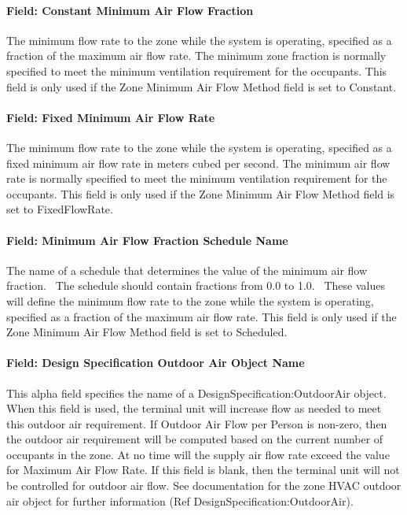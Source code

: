 \paragraph{Field: Constant Minimum Air Flow Fraction}\label{field-constant-minimum-air-flow-fraction-1}

The minimum flow rate to the zone while the system is operating, specified as a fraction of the maximum air flow rate. The minimum zone fraction is normally specified to meet the minimum ventilation requirement for the occupants. This field is only used if the Zone Minimum Air Flow Method field is set to Constant.

\paragraph{Field: Fixed Minimum Air Flow Rate}\label{field-fixed-minimum-air-flow-rate-1}

The minimum flow rate to the zone while the system is operating, specified as a fixed minimum air flow rate in meters cubed per second. The minimum air flow rate is normally specified to meet the minimum ventilation requirement for the occupants. This field is only used if the Zone Minimum Air Flow Method field is set to FixedFlowRate.

\paragraph{Field: Minimum Air Flow Fraction Schedule Name}\label{field-minimum-air-flow-fraction-schedule-name-1}

The name of a schedule that determines the value of the minimum air flow fraction.~ The schedule should contain fractions from 0.0 to 1.0.~ These values will define the minimum flow rate to the zone while the system is operating, specified as a fraction of the maximum air flow rate. This field is only used if the Zone Minimum Air Flow Method field is set to Scheduled.

\paragraph{Field: Design Specification Outdoor Air Object Name}\label{field-design-specification-outdoor-air-object-name-1}

This alpha field specifies the name of a DesignSpecification:OutdoorAir object. When this field is used, the terminal unit will increase flow as needed to meet this outdoor air requirement. If Outdoor Air Flow per Person is non-zero, then the outdoor air requirement will be computed based on the current number of occupants in the zone. At no time will the supply air flow rate exceed the value for Maximum Air Flow Rate. If this field is blank, then the terminal unit will not be controlled for outdoor air flow. See documentation for the zone HVAC outdoor air object for further information (Ref DesignSpecification:OutdoorAir).

